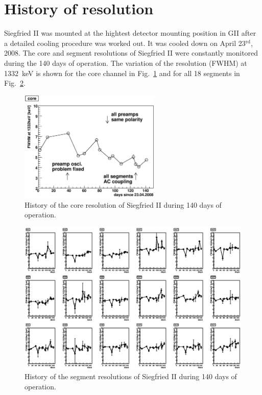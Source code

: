 \section{History of resolution}
\label{sec:ii:sigma}
Siegfried II was mounted at the hightest detector mounting position in GII after a detailed cooling procedure was worked out. It was cooled down on April 23$^{\text{rd}}$, 2008. The core and segment resolutions of Siegfried II were constantly monitored during the 140 days of operation. The variation of the resolution (FWHM) at 1332~keV is shown for the core channel in Fig.~\ref{fig:ii:fwhm_core} and for all 18 segments in Fig.~\ref{fig:ii:fwhm_segs}.
\begin{figure}[hbtp]
\centering
\includegraphics[width=0.6\textwidth]{fwhm_versus_time_core}
\caption{History of the core resolution of Siegfried II during 140 days of operation.}
\label{fig:ii:fwhm_core}
\end{figure}

\begin{figure}
\centering
\includegraphics{fwhm_versus_time_segments}
\caption{History of the segment resolutions of Siegfried II during 140 days of operation.}
\label{fig:ii:fwhm_segs}
\end{figure}

